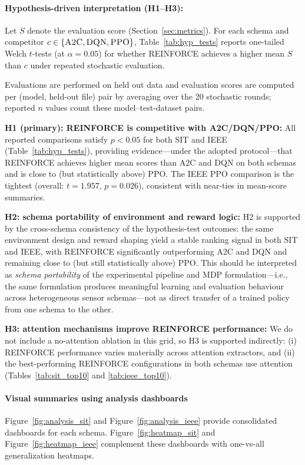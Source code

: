 \documentclass[sn-basic]{sn-jnl} %
\begin{document}
\paragraph{Hypothesis-driven interpretation (H1--H3):}
Let $S$ denote the evaluation score (Section~\ref{sec:metrics}). For each schema and competitor $c\in\{\textsc{A2C},\textsc{DQN},\textsc{PPO}\}$, Table~\ref{tab:hyp_tests} reports one-tailed Welch $t$-tests (at $\alpha=0.05$) for whether \textsc{REINFORCE} achieves a higher mean $S$ than $c$ under repeated stochastic evaluation.

Evaluations are performed on held out data and evaluation scores are computed per (model, held-out file) pair by averaging over the 20 stochastic rounds; reported $n$ values count these model--test-dataset pairs.

\textbf{H1 (primary): \textsc{REINFORCE} is competitive with A2C/DQN/PPO:}
All reported comparisons satisfy $p<0.05$ for both SIT and IEEE (Table~\ref{tab:hyp_tests}), providing evidence---under the adopted protocol---that \textsc{REINFORCE} achieves higher mean scores than \textsc{A2C} and \textsc{DQN} on both schemas and is close to (but statistically above) \textsc{PPO}. The IEEE \textsc{PPO} comparison is the tightest (overall: $t=1.957$, $p=0.026$), consistent with near-ties in mean-score summaries.

\textbf{H2: schema portability of environment and reward logic:}
H2 is supported by the cross-schema consistency of the hypothesis-test outcomes: the same environment design and reward shaping yield a stable ranking signal in both SIT and IEEE, with \textsc{REINFORCE} significantly outperforming \textsc{A2C} and \textsc{DQN} and remaining close to (but still statistically above) \textsc{PPO}. This should be interpreted as \emph{schema portability} of the experimental pipeline and MDP formulation---i.e., the same formulation produces meaningful learning and evaluation behaviour across heterogeneous sensor schemas---not as direct transfer of a trained policy from one schema to the other.

\textbf{H3: attention mechanisms improve \textsc{REINFORCE} performance:}
We do not include a no-attention ablation in this grid, so H3 is supported indirectly: (i) \textsc{REINFORCE} performance varies materially across attention extractors, and (ii) the best-performing \textsc{REINFORCE} configurations in both schemas use attention (Tables~\ref{tab:sit_top10} and \ref{tab:ieee_top10}).

\paragraph{Visual summaries using analysis dashboards}
Figure~\ref{fig:analysis_sit} and Figure~\ref{fig:analysis_ieee} provide consolidated dashboards for each schema. Figure~\ref{fig:heatmap_sit} and Figure~\ref{fig:heatmap_ieee} complement these dashboards with one-vs-all generalization heatmaps.
\end{document}
